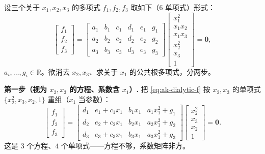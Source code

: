 \begin{example}\label{exam:ak-dialytic}
设三个关于 $x_1,x_2,x_3$ 的多项式 $f_1,f_2,f_3$ 取如下（6 单项式）形式\cite{murray1994mathematical}：
\begin{equation}
\begin{bmatrix}f_1\\f_2\\f_3\end{bmatrix}
=\begin{bmatrix}a_1&b_1&c_1&d_1&e_1&g_1\\a_2&b_2&c_2&d_2&e_2&g_2\\a_3&b_3&c_3&d_3&e_3&g_3\end{bmatrix}
\begin{bmatrix}x_1^2\\x_1x_2\\x_1x_3\\x_2^2\\x_3\\1\end{bmatrix}=\mathbf{0},
\label{eq:ak-dialytic-f}
\end{equation}
$a_i,\dots,g_i\in\mathbb{R}$。欲消去 $x_2,x_3$、求关于 $x_1$ 的公共根多项式，分两步。

\textbf{第一步（视为 $x_2,x_3$ 的方程、系数含 $x_1$）.} 把 \cref{eq:ak-dialytic-f} 按 $x_2,x_3$ 的单项式 $\{x_2^2,x_3,x_2,1\}$ 重组（$x_1$ 当参数）：
\begin{equation}
\begin{bmatrix}f_1\\f_2\\f_3\end{bmatrix}
=\begin{bmatrix}d_1&e_1+c_1x_1&b_1x_1&a_1x_1^2+g_1\\ d_2&e_2+c_2x_1&b_2x_1&a_2x_1^2+g_2\\ d_3&e_3+c_3x_1&b_3x_1&a_3x_1^2+g_3\end{bmatrix}
\begin{bmatrix}x_2^2\\x_3\\x_2\\1\end{bmatrix}=\mathbf{0}.
\label{eq:ak-dialytic-regroup}
\end{equation}
这是 $3$ 个方程、$4$ 个单项式——方程不够，系数矩阵非方。


\end{example}
